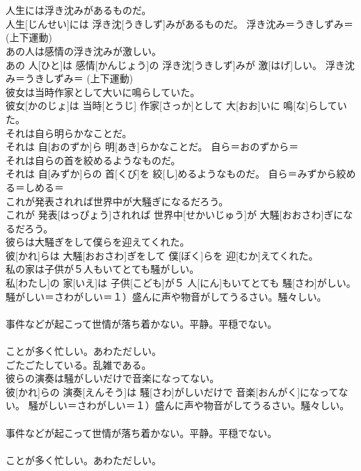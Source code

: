 \documentclass[8pt]{extreport}
\begin{document}
\begin{CJK}{UTF8}{min}
{\\	[鎮める] 
\\	人生には浮き沈みがあるものだ。	
\\	人生[じんせい]には 浮き沈[うきしず]みがあるものだ。	浮き沈み＝うきしずみ＝ (上下運動) 
\\	あの人は感情の浮き沈みが激しい。	
\\	あの 人[ひと]は 感情[かんじょう]の 浮き沈[うきしず]みが 激[はげ]しい。	浮き沈み＝うきしずみ＝ (上下運動) 
\\	彼女は当時作家として大いに鳴らしていた。	
\\	彼女[かのじょ]は 当時[とうじ] 作家[さっか]として 大[おお]いに 鳴[な]らしていた。	
\\	それは自ら明らかなことだ。	
\\	それは 自[おのずか]ら 明[あき]らかなことだ。	自ら＝おのずから＝ 
\\	それは自らの首を絞めるようなものだ。	
\\	それは 自[みずか]らの 首[くび]を 絞[し]めるようなものだ。	自ら＝みずから絞める＝しめる＝ 
\\	これが発表されれば世界中が大騒ぎになるだろう。	
\\	これが 発表[はっぴょう]されれば 世界中[せかいじゅう]が 大騒[おおさわ]ぎになるだろう。	
\\	彼らは大騒ぎをして僕らを迎えてくれた。	
\\	彼[かれ]らは 大騒[おおさわ]ぎをして 僕[ぼく]らを 迎[むか]えてくれた。	
\\	私の家は子供が５人もいてとても騒がしい。	
\\	私[わたし]の 家[いえ]は 子供[こども]が５ 人[にん]もいてとても 騒[さわ]がしい。	騒がしい＝さわがしい＝１）盛んに声や物音がしてうるさい。騒々しい。 　　　　　　　　　　　
\\	事件などが起こって世情が落ち着かない。平静。平穏でない。 　　　　　　　　　　　
\\	ことが多く忙しい。あわただしい。 　　　　　　　　　　　
\\	ごたごたしている。乱雑である。
\\	彼らの演奏は騒がしいだけで音楽になってない。	
\\	彼[かれ]らの 演奏[えんそう]は 騒[さわ]がしいだけで 音楽[おんがく]になってない。	騒がしい＝さわがしい＝１）盛んに声や物音がしてうるさい。騒々しい。 　　　　　　　　　　　
\\	事件などが起こって世情が落ち着かない。平静。平穏でない。 　　　　　　　　　　　
\\	ことが多く忙しい。あわただしい。 　　　　　　　　　　　
}
\end{CJK}
\end{document}
